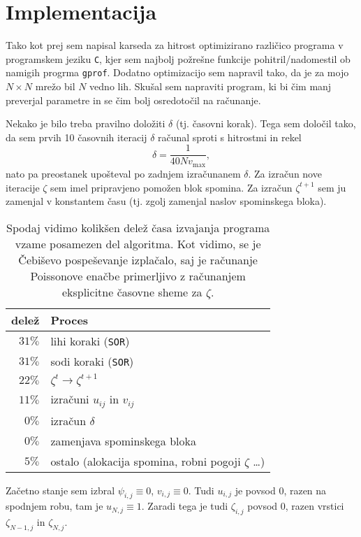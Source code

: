 \documentclass[a4 paper, 12pt]{article}
\begin{document}
\section{Implementacija}

Tako kot prej sem napisal karseda za hitrost optimizirano razli\v cico programa v programskem jeziku
{\tt C}, kjer sem najbolj po\v zre\v sne funkcije pohitril/nadomestil ob namigih progrma {\tt gprof}.
Dodatno optimizacijo sem napravil tako, da je za mojo $N \times N$ mre\v zo bil $N$ vedno lih. Sku\v sal sem
napraviti program, ki bi \v cim manj preverjal parametre in se \v cim bolj osredoto\v cil na ra\v cunanje.

Nekako je bilo treba pravilno dolo\v ziti $\delta$ (tj. \v casovni korak). Tega sem dolo\v cil tako, da sem
prvih 10 \v casovnih iteracij $\delta$ ra\v cunal sproti s hitrostmi in rekel
\[
    \delta = \frac{1}{40 N v_\text{max}},
\]
nato pa preostanek upo\v steval po zadnjem izra\v cunanem $\delta$. Za izra\v cun nove iteracije $\zeta$ sem
imel pripravjeno pomo\v zen blok spomina. Za izra\v cun $\zeta^{t+1}$ sem ju zamenjal v konstantem \v casu
(tj. zgolj zamenjal naslov spominskega bloka).

\begin{table}[H]\centering
    \caption{Spodaj vidimo kolik\v sen dele\v z \v casa izvajanja programa vzame posamezen del algoritma.
    Kot vidimo, se je \v Cebi\v sevo pospe\v sevanje izpla\v calo, saj je ra\v cunanje Poissonove ena\v cbe
    primerljivo z ra\v cunanjem eksplicitne \v casovne sheme za $\zeta$.}
    \begin{tabular}{r|l}
        dele\v z & Proces \\
        \hline
        $31 \%$ & lihi koraki ({\tt SOR}) \\
        $31 \%$ & sodi koraki ({\tt SOR}) \\
        $22 \%$ & $\zeta^{t} \to \zeta^{t+1}$ \\
        $11 \%$ & izra\v cuni $u_{ij}$ in $v_{ij}$ \\
        $0 \%$  & izra\v cun $\delta$ \\
        $0 \%$  & zamenjava spominskega bloka \\
        \hline
        $5 \%$  & ostalo (alokacija spomina, robni pogoji $\zeta$ \ldots)
    \end{tabular}
\end{table}

Za\v cetno stanje sem izbral $\psi_{i,j} \equiv 0$, $v_{i,j} \equiv 0$. Tudi $u_{i,j}$ je povsod 0, razen na
spodnjem robu, tam je $u_{N,j} \equiv 1$. Zaradi tega je tudi $\zeta_{i,j}$ povsod 0, razen vrstici 
$\zeta_{N-1,j}$ in $\zeta_{N,j}$.
\end{document}
